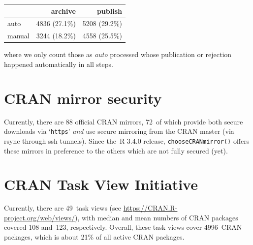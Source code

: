 {\def\LTcaptype{none} %
\begin{longtable}[]{@{}lrr@{}}
\toprule\noalign{}
& archive & publish \\
\midrule\noalign{}
\endhead
\bottomrule\noalign{}
\endlastfoot
auto & 4836 (27.1\%) & 5208 (29.2\%) \\
manual & 3244 (18.2\%) & 4558 (25.5\%) \\
\end{longtable}
}

\noindent where we only count those as \emph{auto} processed whose publication or
rejection happened automatically in all steps.

\section{CRAN mirror security}\label{cran-mirror-security}

Currently, there are 88 official CRAN mirrors,
72~of which provide both
secure downloads via `\texttt{https}' \emph{and} use secure mirroring from the CRAN master
(via rsync through ssh tunnels). Since the~R 3.4.0 release, \texttt{chooseCRANmirror()}
offers these mirrors in preference to the others which are not fully secured (yet).

\section{CRAN Task View Initiative}\label{cran-task-view-initiative}

Currently, there are 49~task views (see \url{https://CRAN.R-project.org/web/views/}),
with median and mean numbers of CRAN packages covered
108 and~123, respectively.
Overall, these task views cover 4996~CRAN packages,
which is about 21\% of all active CRAN packages.


\address{%
Kurt Hornik\\
WU Wirtschaftsuniversität Wien\\%
Austria\\
%
%
\textit{ORCiD: \href{https://orcid.org/0000-0003-4198-9911}{0000-0003-4198-9911}}\\%
\href{mailto:Kurt.Hornik@R-project.org}{\nolinkurl{Kurt.Hornik@R-project.org}}%
}

\address{%
Uwe Ligges\\
TU Dortmund\\%
Germany\\
%
%
\textit{ORCiD: \href{https://orcid.org/0000-0001-5875-6167}{0000-0001-5875-6167}}\\%
\href{mailto:Uwe.Ligges@R-project.org}{\nolinkurl{Uwe.Ligges@R-project.org}}%
}

\address{%
Achim Zeileis\\
Universität Innsbruck\\%
Austria\\
%
%
\textit{ORCiD: \href{https://orcid.org/0000-0003-0918-3766}{0000-0003-0918-3766}}\\%
\href{mailto:Achim.Zeileis@R-project.org}{\nolinkurl{Achim.Zeileis@R-project.org}}%
}
